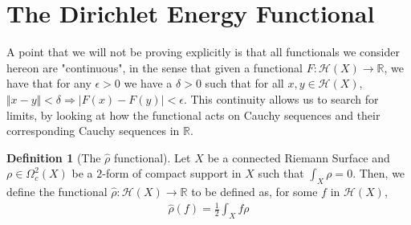 \documentclass[11pt]{report}
\theoremstyle{definition}
\newtheorem{defn}[thm]{Definition}
\begin{document}
\section{The Dirichlet Energy Functional}

A point that we will not be proving explicitly is that all functionals we consider hereon are "continuous", in the sense that given a functional $F:\mathcal{H}(X) \rightarrow \mathbb{R}$, we have that for any $\epsilon > 0$ we have a $\delta > 0$ such that for all $x,y \in \mathcal{H}(X)$, $\Vert x - y \Vert < \delta \Rightarrow |F(x) - F(y)| < \epsilon$. This continuity allows us to search for limits, by looking at how the functional acts on Cauchy sequences and their corresponding Cauchy sequences in $\mathbb{R}$.

\begin{defn}[The $\hat{\rho}$ functional]
  Let $X$ be a connected Riemann Surface and $\rho \in \Omega^2_c(X)$ be a $2$-form of compact support in $X$ such that $\int_X \rho = 0$. Then, we define the functional $\hat{\rho} \colon \mathcal{H}(X) \rightarrow \mathbb{R}$ to be defined as, for some $f$ in $\mathcal{H}(X)$,
  \begin{align*}
    \hat{\rho}(f) = \frac{1}{2}\int_X f\rho
  \end{align*}
\end{defn}
\end{document}
